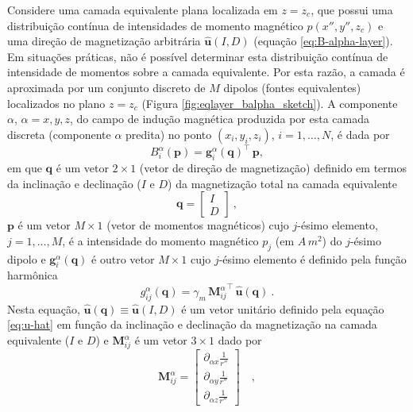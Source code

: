 Considere uma camada equivalente plana localizada em $z = z_{c}$, que possui uma distribuição 
contínua de intensidades de momento magnético $p(x'',y'',z_{c})$ e uma direção de magnetização 
arbitrária $\hat{\mathbf{u}}(I, D)$ (equação \ref{eq:B-alpha-layer}). 
Em situações práticas, não é possível determinar esta distribuição contínua de intensidade de momentos 
sobre a camada equivalente. 
Por esta razão, a camada é aproximada por um conjunto discreto de $M$ dipolos (fontes equivalentes) 
localizados no plano $z = z_{c}$ (Figura \ref{fig:eqlayer_balpha_sketch}).
A componente $\alpha$, $\alpha = x, y, z$, do campo de indução magnética produzida por esta camada 
discreta (componente $\alpha$ predita) no ponto $(x_{i},y_{i},z_{i})$, $i=1,\dots,N$, é dada por 
\begin{equation}
B^{\alpha}_{i} (\mathbf{p})  = \mathbf{g}^{\alpha}_{i}(\mathbf{q})^{\top} \, \mathbf{p},
\label{eq:balpha-pred-i}
\end{equation}
em que $\mathbf{q}$ é um vetor $2 \times 1$ (vetor de direção de magnetização) definido 
em termos da inclinação e declinação ($I$ e $D$) da magnetização total na camada equivalente
\begin{equation}
\mathbf{q} = \begin{bmatrix}
I \\ D 
\end{bmatrix} \: ,
\label{eq:q-vector}
\end{equation}
$\mathbf{p}$ é um vetor $M \times 1$ (vetor de momentos magnéticos) cujo $j$-ésimo elemento, $j=1,\dots,M$, 
é a intensidade do momento magnético $p_{j}$ (em $A \, m^{2}$) do $j$-ésimo dipolo e 
$\mathbf{g}^{\alpha}_{i}(\mathbf{q})$ é outro vetor $M \times 1$ cujo $j$-ésimo elemento é definido pela 
função harmônica 
\begin{equation}
g_{ij}^{\alpha}(\mathbf{q})  = \gamma_{m} \, {\mathbf{M}^{\alpha}_{ij}}^{\top} \, \hat{\mathbf{u}}(\mathbf{q}) \: .
\label{eq:g_ij-alpha}
\end{equation}
Nesta equação, $\hat{\mathbf{u}}(\mathbf{q}) \equiv \hat{\mathbf{u}}(I, D)$ é um vetor unitário
definido pela equação \ref{eq:u-hat} em função da inclinação e declinação 
da magnetização na camada equivalente ($I$ e $D$) e $\mathbf{M}^{\alpha}_{ij}$ é um vetor $3 \times 1$ 
dado por 
\begin{equation}
\mathbf{M}^{\alpha}_{ij} = \begin{bmatrix}
\partial_{\alpha x} \frac{1}{r''} \\
\partial_{\alpha y} \frac{1}{r''} \\
\partial_{\alpha z} \frac{1}{r''}
\end{bmatrix} \quad ,
\label{eq:Mij-matrix-alpha}
\end{equation}
